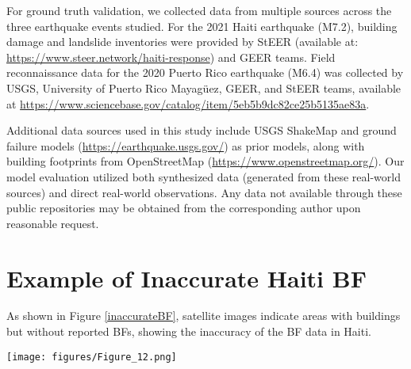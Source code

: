 \documentclass[review]{elsarticle}
\begin{document}
For ground truth validation, we collected data from multiple sources across the three earthquake events studied. For the 2021 Haiti earthquake (M7.2), building damage and landslide inventories were provided by StEER (available at: \url{https://www.steer.network/haiti-response}) and GEER teams. Field reconnaissance data for the 2020 Puerto Rico earthquake (M6.4) was collected by USGS, University of Puerto Rico Mayagüez, GEER, and StEER teams, available at \url{https://www.sciencebase.gov/catalog/item/5eb5b9dc82ce25b5135ae83a}.

Additional data sources used in this study include USGS ShakeMap and ground failure models (\url{https://earthquake.usgs.gov/}) as prior models, along with building footprints from OpenStreetMap (\url{https://www.openstreetmap.org/}). Our model evaluation utilized both synthesized data (generated from these real-world sources) and direct real-world observations. Any data not available through these public repositories may be obtained from the corresponding author upon reasonable request.










\appendixpage
\appendix  %
\section{Example of Inaccurate Haiti BF}\label{Appendix_inaccurate_BF}
As shown in Figure \ref{inaccurateBF}, satellite images indicate areas with buildings but without reported BFs, showing the inaccuracy of the BF data in Haiti.
\begin{figure*}[tb]
    \centering
    \texttt{[image: figures/Figure\_12.png]}
    \caption{Satellite images with reported BF demonstrated the inaccuracy of the BF.}
    \label{inaccurateBF}
\end{figure*}
\end{document}
